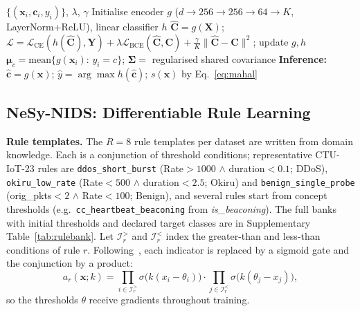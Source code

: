 \documentclass[journal]{IEEEtran}
\begin{document}
\begin{algorithm}[!t]
\caption{CBM Training and OOD Scoring}
\label{alg:cbm}
\begin{algorithmic}[1]
\footnotesize
\Require $\{(\mathbf{x}_i,\mathbf{c}_i,y_i)\}$, $\lambda$, $\gamma$
\State Initialise encoder $g$ ($d{\to}256{\to}256{\to}64{\to}K$, LayerNorm+ReLU), linear classifier $h$
  \State $\hat{\mathbf{C}}{=}g(\mathbf{X})$;\; $\mathcal{L}{=}\mathcal{L}_{\mathrm{CE}}(h(\hat{\mathbf{C}}),\mathbf{Y}){+}\lambda\mathcal{L}_{\mathrm{BCE}}(\hat{\mathbf{C}},\mathbf{C}){+}\tfrac{\gamma}{K}\|\hat{\mathbf{C}}{-}\mathbf{C}\|^2$;\; update $g,h$
\EndFor
\State $\boldsymbol{\mu}_c{=}\mathrm{mean}\{g(\mathbf{x}_i){:}\,y_i{=}c\}$;\; $\boldsymbol{\Sigma}{=}$ regularised shared covariance
\State \textbf{Inference:} $\hat{\mathbf{c}}{=}g(\mathbf{x})$;\; $\hat{y}{=}\arg\max h(\hat{\mathbf{c}})$;\; $s(\mathbf{x})$ by Eq.~\ref{eq:mahal}
\end{algorithmic}
\end{algorithm}

\subsection{NeSy-NIDS: Differentiable Rule Learning}
\label{sec:nesy}

\textbf{Rule templates.} The $R{=}8$ rule templates per dataset are written from domain knowledge. Each is a conjunction of threshold conditions; representative CTU-IoT-23 rules are \texttt{ddos\_short\_burst} (Rate${>}1000$ $\wedge$ duration${<}0.1$; DDoS), \texttt{okiru\_low\_rate} (Rate${<}500$ $\wedge$ duration${<}2.5$; Okiru) and \texttt{benign\_single\_probe} (orig\_pkts${<}2$ $\wedge$ Rate${<}100$; Benign), and several rules start from concept thresholds (e.g.\ \texttt{cc\_heartbeat\_beaconing} from \textit{is\_beaconing}). The full banks with initial thresholds and declared target classes are in Supplementary Table~\ref{tab:rulebank}. Let $\mathcal{I}_r^{>}$ and $\mathcal{I}_r^{<}$ index the greater-than and less-than conditions of rule $r$. Following~\cite{petersen2022logic}, each indicator is replaced by a sigmoid gate and the conjunction by a product:
\begin{equation}
  a_r(\mathbf{x};k) =
    \prod_{i\in\mathcal{I}_r^{>}}\!\sigma\!\bigl(k(x_i{-}\theta_i)\bigr)\cdot
    \prod_{j\in\mathcal{I}_r^{<}}\!\sigma\!\bigl(k(\theta_j{-}x_j)\bigr),
  \label{eq:rule_score}
\end{equation}
so the thresholds $\theta$ receive gradients throughout training.
\end{document}
